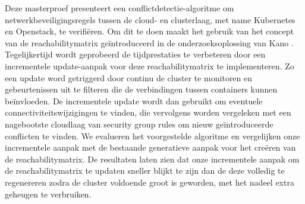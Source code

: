 Deze masterproef presenteert een conflictdetectie-algoritme om netwerkbeveiligingsregels tussen de cloud- en clusterlaag, met name Kubernetes en Openstack, te verifiëren. Om dit te doen maakt het gebruik van het concept van de reachabilitymatrix geïntroduceerd in de onderzoeksoplossing van Kano \cite{kano}. Tegelijkertijd wordt geprobeerd de tijdprestaties te verbeteren door een incrementele update-aanpak voor deze reachabilitymatrix te implementeren. Zo een update word getriggerd door continu de cluster te monitoren en gebeurtenissen uit te filteren die de verbindingen tussen containers kunnen beïnvloeden. De incrementele update wordt dan gebruikt om eventuele connectiviteitswijzigingen te vinden, die vervolgens worden vergeleken met een nagebootste cloudlaag van security group rules om nieuw geïntroduceerde conflicten te vinden. We evalueren het voorgestelde algoritme en vergelijken onze incrementele aanpak met de bestaande generatieve aanpak voor het creëren van de  reachabilitymatrix. De resultaten laten zien dat onze incrementele aanpak om de reachabilitymatrix te updaten sneller blijkt te zijn dan de deze volledig te regenereren zodra de cluster voldoende groot is geworden, met het nadeel extra geheugen te verbruiken.  



